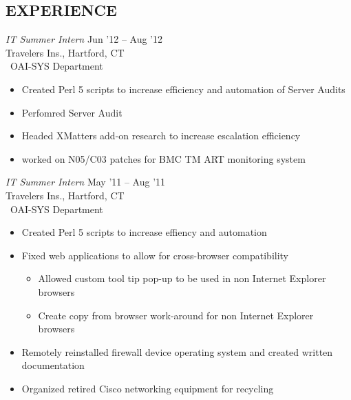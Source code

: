 \documentclass[margin]{res}
\begin{document}
\begin{resume}
\section{EXPERIENCE} {\sl IT Summer Intern} \hfill Jun '12 -- Aug '12 \\
                Travelers Ins., Hartford, CT\\\
                OAI-SYS Department
                \begin{itemize}  \itemsep -2pt %
                    \item Created Perl 5 scripts to increase efficiency and
                          automation of Server Audits
                    \item Perfomred Server Audit
                    \item Headed XMatters add-on research to increase escalation
                          efficiency
                    \item worked on N05/C03 patches for BMC TM ART monitoring
                          system
                \end{itemize}
 
                {\sl IT Summer Intern} \hfill  May '11 -- Aug '11 \\
                Travelers Ins., Hartford, CT\\\
                OAI-SYS Department
                \begin{itemize}  \itemsep -2pt %
                    \item Created Perl 5 scripts to increase effiency and 
                          automation
                    \item Fixed web applications to allow for cross-browser 
                          compatibility
                    \begin{itemize}
                        \item Allowed custom tool tip pop-up to be used in non
                              Internet Explorer browsers
                        \item Create copy from browser work-around for non
                              Internet Explorer browsers
                    \end{itemize}
                    \item Remotely reinstalled firewall device operating
                          system and created written documentation
                    \item Organized retired Cisco networking equipment for
                          recycling
                \end{itemize} 
 

\end{resume}
\end{document}

